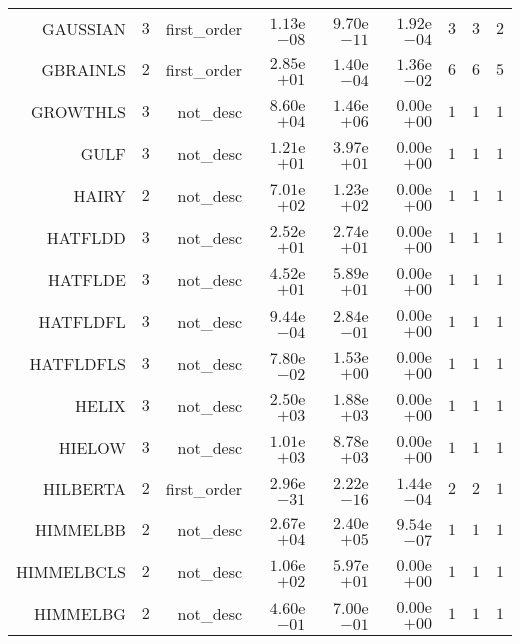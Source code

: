 \begin{longtable}{rrrrrrrrr}
GAUSSIAN & \(     3\) & first\_order & \( 1.13\)e\(-08\) & \( 9.70\)e\(-11\) & \( 1.92\)e\(-04\) & \(     3\) & \(     3\) & \(     2\) \\
GBRAINLS & \(     2\) & first\_order & \( 2.85\)e\(+01\) & \( 1.40\)e\(-04\) & \( 1.36\)e\(-02\) & \(     6\) & \(     6\) & \(     5\) \\
GROWTHLS & \(     3\) & not\_desc & \( 8.60\)e\(+04\) & \( 1.46\)e\(+06\) & \( 0.00\)e\(+00\) & \(     1\) & \(     1\) & \(     1\) \\
GULF & \(     3\) & not\_desc & \( 1.21\)e\(+01\) & \( 3.97\)e\(+01\) & \( 0.00\)e\(+00\) & \(     1\) & \(     1\) & \(     1\) \\
HAIRY & \(     2\) & not\_desc & \( 7.01\)e\(+02\) & \( 1.23\)e\(+02\) & \( 0.00\)e\(+00\) & \(     1\) & \(     1\) & \(     1\) \\
HATFLDD & \(     3\) & not\_desc & \( 2.52\)e\(+01\) & \( 2.74\)e\(+01\) & \( 0.00\)e\(+00\) & \(     1\) & \(     1\) & \(     1\) \\
HATFLDE & \(     3\) & not\_desc & \( 4.52\)e\(+01\) & \( 5.89\)e\(+01\) & \( 0.00\)e\(+00\) & \(     1\) & \(     1\) & \(     1\) \\
HATFLDFL & \(     3\) & not\_desc & \( 9.44\)e\(-04\) & \( 2.84\)e\(-01\) & \( 0.00\)e\(+00\) & \(     1\) & \(     1\) & \(     1\) \\
HATFLDFLS & \(     3\) & not\_desc & \( 7.80\)e\(-02\) & \( 1.53\)e\(+00\) & \( 0.00\)e\(+00\) & \(     1\) & \(     1\) & \(     1\) \\
HELIX & \(     3\) & not\_desc & \( 2.50\)e\(+03\) & \( 1.88\)e\(+03\) & \( 0.00\)e\(+00\) & \(     1\) & \(     1\) & \(     1\) \\
HIELOW & \(     3\) & not\_desc & \( 1.01\)e\(+03\) & \( 8.78\)e\(+03\) & \( 0.00\)e\(+00\) & \(     1\) & \(     1\) & \(     1\) \\
HILBERTA & \(     2\) & first\_order & \( 2.96\)e\(-31\) & \( 2.22\)e\(-16\) & \( 1.44\)e\(-04\) & \(     2\) & \(     2\) & \(     1\) \\
HIMMELBB & \(     2\) & not\_desc & \( 2.67\)e\(+04\) & \( 2.40\)e\(+05\) & \( 9.54\)e\(-07\) & \(     1\) & \(     1\) & \(     1\) \\
HIMMELBCLS & \(     2\) & not\_desc & \( 1.06\)e\(+02\) & \( 5.97\)e\(+01\) & \( 0.00\)e\(+00\) & \(     1\) & \(     1\) & \(     1\) \\
HIMMELBG & \(     2\) & not\_desc & \( 4.60\)e\(-01\) & \( 7.00\)e\(-01\) & \( 0.00\)e\(+00\) & \(     1\) & \(     1\) & \(     1\) \\

\end{longtable}
